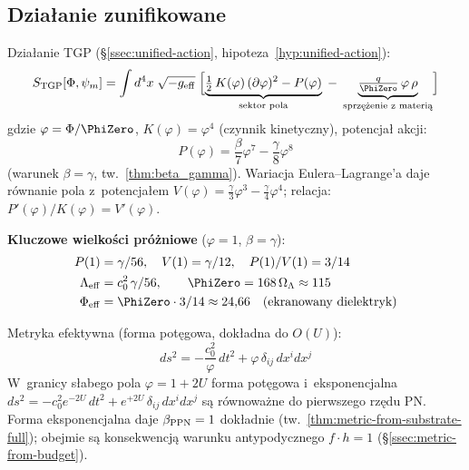 \subsection*{Dzia\l{}anie zunifikowane}

Dzia\l{}anie TGP (\S\ref{ssec:unified-action}, hipoteza~\ref{hyp:unified-action}):
\begin{equation}\label{eq:S-TGP-summary}
S_{\mathrm{TGP}}[\Phi,\psi_m]
= \int d^4x\;\sqrt{-g_{\mathrm{eff}}}\;\Bigl[
  \underbrace{\tfrac{1}{2}\,K(\varphi)\,
  (\partial\varphi)^2 - P(\varphi)}_{\text{sektor pola}}
  \;-\;
  \underbrace{\tfrac{q}{\PhiZero}\,\varphi\,\rho}_{\text{sprz\k{e}\.zenie z~materi\k{a}}}
\Bigr]
\end{equation}
gdzie $\varphi = \Phi/\PhiZero$,\;
$K(\varphi) = \varphi^4$ (czynnik kinetyczny),\;
potencja\l{} akcji:
\begin{equation}\label{eq:P-action-summary}
P(\varphi) = \frac{\beta}{7}\varphi^7 - \frac{\gamma}{8}\varphi^8
\end{equation}
(warunek $\beta = \gamma$, tw.~\ref{thm:beta_gamma}).
Wariacja Eulera--Lagrange'a daje r\'ownanie pola z~potencja\l{}em
$V(\varphi) = \frac{\gamma}{3}\varphi^3 - \frac{\gamma}{4}\varphi^4$;
relacja: $P'(\varphi)/K(\varphi) = V'(\varphi)$.

\medskip\noindent
\textbf{Kluczowe wielko\'sci pr\'o\.zniowe} ($\varphi = 1$, $\beta = \gamma$):
\begin{align}
P(1) &= \gamma/56,\quad V(1) = \gamma/12,\quad P(1)/V(1) = 3/14 \label{eq:screening-ratio}\\
\Lambda_{\mathrm{eff}} &= c_0^2\,\gamma/56,\qquad
\PhiZero = 168\,\Omega_\Lambda \approx 115 \label{eq:Phi0-bare}\\
\Phi_{\mathrm{eff}} &= \PhiZero \cdot 3/14 \approx 24{,}66
  \quad\text{(ekranowany dielektryk)} \label{eq:Phi-eff}
\end{align}

\noindent Metryka efektywna (forma pot\k{e}gowa, dok\l{}adna do $O(U)$):
\begin{equation}
ds^2 = -\frac{c_0^2}{\varphi}\,dt^2 + \varphi\,\delta_{ij}\,dx^i dx^j
\end{equation}
W~granicy s\l{}abego pola $\varphi = 1 + 2U$ forma pot\k{e}gowa
i~eksponencjalna
$ds^2 = -c_0^2 e^{-2U}\,dt^2 + e^{+2U}\,\delta_{ij}\,dx^i dx^j$
s\k{a} r\'ownowa\.zne do pierwszego rz\k{e}du PN.
Forma eksponencjalna daje $\beta_{\rm PPN} = 1$ dok\l{}adnie
(tw.~\ref{thm:metric-from-substrate-full});
obe\-jmie s\k{a} konsekwencj\k{a} warunku antypodycznego
$f \cdot h = 1$ (\S\ref{ssec:metric-from-budget}).


